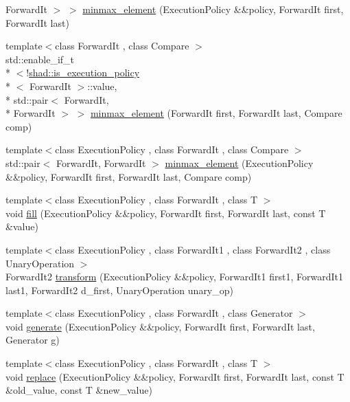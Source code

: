 \begin{DoxyCompactItemize}
Forward\-It $>$ $>$ \hyperlink{namespaceshad_af24b9e8c34031c3eb513512540d75220}{minmax\-\_\-element} (Execution\-Policy \&\&policy, Forward\-It first, Forward\-It last)
\item 
{\footnotesize template$<$class Forward\-It , class Compare $>$ }\\std\-::enable\-\_\-if\-\_\-t\\*
$<$!\hyperlink{structshad_1_1is__execution__policy}{shad\-::is\-\_\-execution\-\_\-policy}\\*
$<$ Forward\-It $>$\-::value, \\*
std\-::pair$<$ Forward\-It, \\*
Forward\-It $>$ $>$ \hyperlink{namespaceshad_a16fcfebd88d79295c4f5ff4762e17329}{minmax\-\_\-element} (Forward\-It first, Forward\-It last, Compare comp)
\item 
{\footnotesize template$<$class Execution\-Policy , class Forward\-It , class Compare $>$ }\\std\-::pair$<$ Forward\-It, Forward\-It $>$ \hyperlink{namespaceshad_a19b6f97e22a10d008622ad4e49de5f6b}{minmax\-\_\-element} (Execution\-Policy \&\&policy, Forward\-It first, Forward\-It last, Compare comp)
\item 
{\footnotesize template$<$class Execution\-Policy , class Forward\-It , class T $>$ }\\void \hyperlink{namespaceshad_ab21c74ec57b46160ad590b2e989c4ea6}{fill} (Execution\-Policy \&\&policy, Forward\-It first, Forward\-It last, const T \&value)
\item 
{\footnotesize template$<$class Execution\-Policy , class Forward\-It1 , class Forward\-It2 , class Unary\-Operation $>$ }\\Forward\-It2 \hyperlink{namespaceshad_a7a39d855612f2a2957f27b7571e9dc54}{transform} (Execution\-Policy \&\&policy, Forward\-It1 first1, Forward\-It1 last1, Forward\-It2 d\-\_\-first, Unary\-Operation unary\-\_\-op)
\item 
{\footnotesize template$<$class Execution\-Policy , class Forward\-It , class Generator $>$ }\\void \hyperlink{namespaceshad_a9bd5736fe5e18ec23a7d7e5913a11df8}{generate} (Execution\-Policy \&\&policy, Forward\-It first, Forward\-It last, Generator g)
\item 
{\footnotesize template$<$class Execution\-Policy , class Forward\-It , class T $>$ }\\void \hyperlink{namespaceshad_a0c0ef45cc72fdfcc83ec82af01154289}{replace} (Execution\-Policy \&\&policy, Forward\-It first, Forward\-It last, const T \&old\-\_\-value, const T \&new\-\_\-value)

\end{DoxyCompactItemize}
